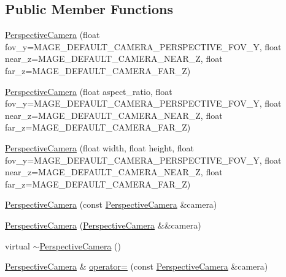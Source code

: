 \subsection*{Public Member Functions}
\begin{DoxyCompactItemize}
\item 
\hyperlink{classmage_1_1_perspective_camera_a5f832d99b65ea5b48cb0293f8c25a036}{Perspective\+Camera} (float fov\+\_\+y=M\+A\+G\+E\+\_\+\+D\+E\+F\+A\+U\+L\+T\+\_\+\+C\+A\+M\+E\+R\+A\+\_\+\+P\+E\+R\+S\+P\+E\+C\+T\+I\+V\+E\+\_\+\+F\+O\+V\+\_\+Y, float near\+\_\+z=M\+A\+G\+E\+\_\+\+D\+E\+F\+A\+U\+L\+T\+\_\+\+C\+A\+M\+E\+R\+A\+\_\+\+N\+E\+A\+R\+\_\+Z, float far\+\_\+z=M\+A\+G\+E\+\_\+\+D\+E\+F\+A\+U\+L\+T\+\_\+\+C\+A\+M\+E\+R\+A\+\_\+\+F\+A\+R\+\_\+Z)
\item 
\hyperlink{classmage_1_1_perspective_camera_a118a233aa484bbff31032703087a5a8c}{Perspective\+Camera} (float aspect\+\_\+ratio, float fov\+\_\+y=M\+A\+G\+E\+\_\+\+D\+E\+F\+A\+U\+L\+T\+\_\+\+C\+A\+M\+E\+R\+A\+\_\+\+P\+E\+R\+S\+P\+E\+C\+T\+I\+V\+E\+\_\+\+F\+O\+V\+\_\+Y, float near\+\_\+z=M\+A\+G\+E\+\_\+\+D\+E\+F\+A\+U\+L\+T\+\_\+\+C\+A\+M\+E\+R\+A\+\_\+\+N\+E\+A\+R\+\_\+Z, float far\+\_\+z=M\+A\+G\+E\+\_\+\+D\+E\+F\+A\+U\+L\+T\+\_\+\+C\+A\+M\+E\+R\+A\+\_\+\+F\+A\+R\+\_\+Z)
\item 
\hyperlink{classmage_1_1_perspective_camera_af04c3995faa777606a1cd610acad43c0}{Perspective\+Camera} (float width, float height, float fov\+\_\+y=M\+A\+G\+E\+\_\+\+D\+E\+F\+A\+U\+L\+T\+\_\+\+C\+A\+M\+E\+R\+A\+\_\+\+P\+E\+R\+S\+P\+E\+C\+T\+I\+V\+E\+\_\+\+F\+O\+V\+\_\+Y, float near\+\_\+z=M\+A\+G\+E\+\_\+\+D\+E\+F\+A\+U\+L\+T\+\_\+\+C\+A\+M\+E\+R\+A\+\_\+\+N\+E\+A\+R\+\_\+Z, float far\+\_\+z=M\+A\+G\+E\+\_\+\+D\+E\+F\+A\+U\+L\+T\+\_\+\+C\+A\+M\+E\+R\+A\+\_\+\+F\+A\+R\+\_\+Z)
\item 
\hyperlink{classmage_1_1_perspective_camera_a198d1460d9312af27ed6ef2ac28b616d}{Perspective\+Camera} (const \hyperlink{classmage_1_1_perspective_camera}{Perspective\+Camera} \&camera)
\item 
\hyperlink{classmage_1_1_perspective_camera_a04531e5b956e72300337571e0eb7143d}{Perspective\+Camera} (\hyperlink{classmage_1_1_perspective_camera}{Perspective\+Camera} \&\&camera)
\item 
virtual \hyperlink{classmage_1_1_perspective_camera_a47ba88d7458528795dd832474cdb3eb9}{$\sim$\+Perspective\+Camera} ()
\item 
\hyperlink{classmage_1_1_perspective_camera}{Perspective\+Camera} \& \hyperlink{classmage_1_1_perspective_camera_a0fe5ef8bd4d28efa8e4851a8055b6fa5}{operator=} (const \hyperlink{classmage_1_1_perspective_camera}{Perspective\+Camera} \&camera)

\end{DoxyCompactItemize}
